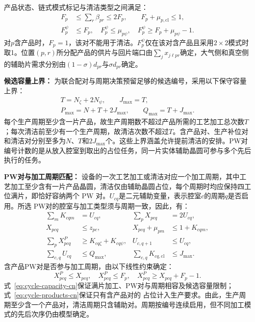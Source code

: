 \documentclass[final,5p,times,twocolumn]{elsarticle}
\begin{document}
产品状态、链式模式标记与清洁类型之间满足：
\begin{equation}
\begin{aligned}
F_p&\le\sum_r\beta_{pr}\le2F_p,\qquad F_p+\mu_{p,\mathrm{cl}}\le1,\\
F_p^\psi&\le F_p,\quad F_p^\psi\le\mu_{p\psi},\quad
F_p^\psi\ge F_p+\mu_{p\psi}-1.
\end{aligned}
\label{eq:pair-type-cn}
\end{equation}
对$p$含产品时，$F_p=1$，该对不能用于清洁。$F_p^\psi$仅在该对含产品且采用$2\times2$模式时取1。位置$(p,r)$所分配产品的供片与回片端口由$\sum_jx_{j\ell pr}$确定，大气侧和真空侧的辅助片需求分别由$(1-\sigma)d_{pr}$与$\sigma d_{pr}$确定。

\noindent\textbf{候选容量上界：}
为联合配对与周期决策预留足够的候选编号，采用以下保守容量上界：
\begin{equation}
\begin{gathered}
T=N_{\zeta}+2N_{\psi},\qquad J_{\max}=T,\\
P_{\max}=N+T+2J_{\max},\qquad Q_{\max}=T+J_{\max}.
\end{gathered}
\label{eq:candidate-bounds-cn}
\end{equation}
每个生产周期至少含一片产品，故生产周期数不超过产品所需的工艺加工总次数$T$；每次清洁前至少有一个生产周期，故清洁次数不超过$T$。含产品对、生产补位对和清洁对分别至多为$N$、$T$和$2J_{\max}$个。这些上界涵盖允许提前清洁的安排。PW对编号计数的是从放入腔室到取出的占位任务，同一片实体辅助晶圆可参与多个先后执行的任务。

\noindent\textbf{PW对与加工周期匹配：}
设备的一次工艺加工或清洁对应一个加工周期，其中工艺加工至少含有一片产品晶圆，清洁仅由辅助晶圆占位，每个周期时均应保持四工位满片，即恰好容纳两个 PW 对。$U_{cq}$是二元辅助变量，表示腔室$c$的周期$q$是否启用。所选
PW对的腔室与加工类型须与周期一致，因此，有：
\begin{equation}
\begin{aligned}
\sum_mK_{cqm}&=U_{cq}, &\sum_pX_{pcq}&=2U_{cq},\\
X_{pcq}&\le z_{pc}, &X_{pcq}+\mu_{pm}&\le1+K_{cqm},\\
\sum_pX^P_{pcq}&\ge K_{cq\zeta}+K_{cq\psi}, &U_{c,q+1}&\le U_{cq},\\
\sum_{c,q}U_{cq}&\le Q_{\max}, &\sum_{c,q}K_{cq,\mathrm{cl}}&\le J_{\max}.
\end{aligned}
\label{eq:cycle-capacity-cn}
\end{equation}
含产品PW对是否参与加工周期，由以下线性约束确定：
\begin{equation}
X^P_{pcq}\le X_{pcq},\quad X^P_{pcq}\le F_p,\quad
X^P_{pcq}\ge X_{pcq}+F_p-1.
\label{eq:cycle-products-cn}
\end{equation}
式~\eqref{eq:cycle-capacity-cn}保证满片加工、PW对与周期相容及候选容量限制；式~\eqref{eq:cycle-products-cn}保证只有含产品对的
占位计入生产要求。由此，生产周期至少含一个产品对，清洁周期只含辅助对。周期按编号连续启用，但不同加工模式的先后次序仍由模型确定。
\end{document}
